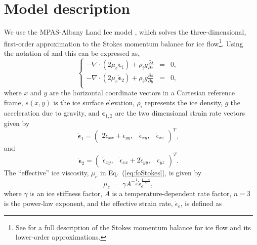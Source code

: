 \documentclass[tc, manuscript]{copernicus}
\begin{document}
\section{Model description}
We use the MPAS-Albany Land Ice model \citep[MALI;][]{hoffman2018}, which solves the three-dimensional, first-order approximation to the Stokes momentum balance for ice flow\footnote{See \citet{schoof2013} for a full description of the Stokes momentum balance for ice flow and its lower-order approximations.}. Using the notation  of \citet{perego2012} and \citet{tezaur2015a} this can be expressed as, 
\begin{equation} \label{eq:foStokes}
\left\{
\begin{array}{rcl} -\nabla \cdot (2 \mu_e \dot{\boldsymbol{\epsilon}}_1) + \rho_{i} g
\frac{\partial s}{\partial x}&=&0, \\
-\nabla \cdot (2 \mu_e \dot{\boldsymbol{\epsilon}}_2) +\rho_{i} g
\frac{\partial s}{\partial y} &=& 0, \\
\end{array}\right.
\end{equation}
where $x$ and $y$ are the horizontal coordinate vectors in a Cartesian reference frame, $s(x,y)$ is the ice surface elevation, $\rho_{i}$ represents the ice density, $g$ the acceleration due to gravity, and $\dot{\boldsymbol{\epsilon}}_{1,2}$ are the two dimensional strain rate vectors given by
\begin{equation}
\dot{\boldsymbol{\epsilon}}_1 = \left(\begin{array}{ccc}
2\dot{\epsilon}_{xx} + \dot{\epsilon}_{yy}, &\dot{\epsilon}_{xy},&
\dot{\epsilon}_{xz}\end{array}\right)^T,
\end{equation}
and
\begin{equation}
\dot{\boldsymbol{\epsilon}}_2 = \left(
\begin{array}{ccc}\dot{\epsilon}_{xy}, &
\dot{\epsilon}_{xx} + 2\dot{\epsilon}_{yy}, &\dot{\epsilon}_{yz}
\end{array}\right)^T.
\end{equation}
The ``effective'' ice viscosity, $ \mu_e$ in  Eq.~(\ref{eq:foStokes}), is given by 
\begin{equation}
\label{eq:effvisc}
    \mu_{e}~=~\gamma A^{-\frac{1}{n}}\dot{\epsilon}_{e}^{\frac{1-n}{n}},
\end{equation}
where $\gamma$ is an ice stiffness factor, $A$ is a temperature-dependent rate factor, $n=3$ is the power-law exponent, and the effective strain rate, $\dot{\epsilon}_{e}$, is defined as
\end{document}

